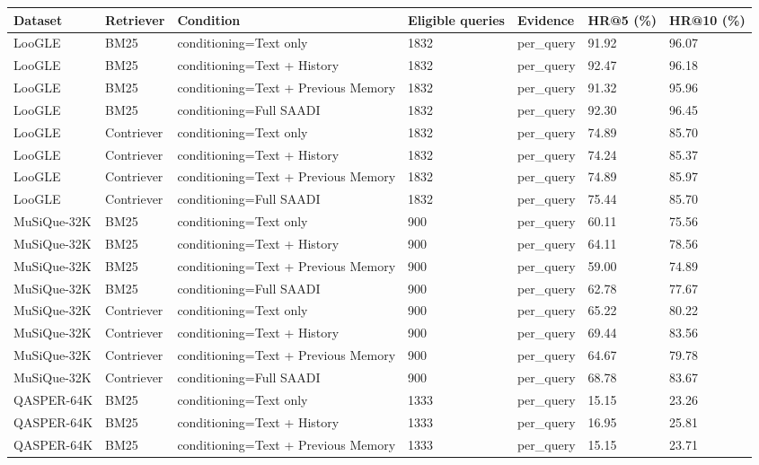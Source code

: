 \begin{tabular}{lllllll}
\hline
Dataset & Retriever & Condition & Eligible queries & Evidence & HR@5 (\%) & HR@10 (\%) \\
\hline
LooGLE & BM25 & conditioning=Text only & 1832 & per\_query & 91.92 & 96.07 \\
LooGLE & BM25 & conditioning=Text + History & 1832 & per\_query & 92.47 & 96.18 \\
LooGLE & BM25 & conditioning=Text + Previous Memory & 1832 & per\_query & 91.32 & 95.96 \\
LooGLE & BM25 & conditioning=Full SAADI & 1832 & per\_query & 92.30 & 96.45 \\
LooGLE & Contriever & conditioning=Text only & 1832 & per\_query & 74.89 & 85.70 \\
LooGLE & Contriever & conditioning=Text + History & 1832 & per\_query & 74.24 & 85.37 \\
LooGLE & Contriever & conditioning=Text + Previous Memory & 1832 & per\_query & 74.89 & 85.97 \\
LooGLE & Contriever & conditioning=Full SAADI & 1832 & per\_query & 75.44 & 85.70 \\
MuSiQue-32K & BM25 & conditioning=Text only & 900 & per\_query & 60.11 & 75.56 \\
MuSiQue-32K & BM25 & conditioning=Text + History & 900 & per\_query & 64.11 & 78.56 \\
MuSiQue-32K & BM25 & conditioning=Text + Previous Memory & 900 & per\_query & 59.00 & 74.89 \\
MuSiQue-32K & BM25 & conditioning=Full SAADI & 900 & per\_query & 62.78 & 77.67 \\
MuSiQue-32K & Contriever & conditioning=Text only & 900 & per\_query & 65.22 & 80.22 \\
MuSiQue-32K & Contriever & conditioning=Text + History & 900 & per\_query & 69.44 & 83.56 \\
MuSiQue-32K & Contriever & conditioning=Text + Previous Memory & 900 & per\_query & 64.67 & 79.78 \\
MuSiQue-32K & Contriever & conditioning=Full SAADI & 900 & per\_query & 68.78 & 83.67 \\
QASPER-64K & BM25 & conditioning=Text only & 1333 & per\_query & 15.15 & 23.26 \\
QASPER-64K & BM25 & conditioning=Text + History & 1333 & per\_query & 16.95 & 25.81 \\
QASPER-64K & BM25 & conditioning=Text + Previous Memory & 1333 & per\_query & 15.15 & 23.71 \\

\end{tabular}
